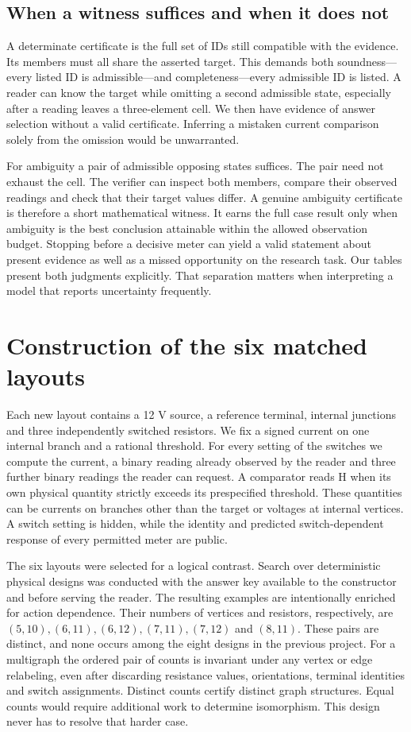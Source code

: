 \documentclass[12pt,letterpaper]{article}
\begin{document}
\subsection{When a witness suffices and when it does not}

A determinate certificate is the full set of IDs still compatible with the evidence. Its members must all share the asserted target. This demands both soundness---every listed ID is admissible---and completeness---every admissible ID is listed. A reader can know the target while omitting a second admissible state, especially after a reading leaves a three-element cell. We then have evidence of answer selection without a valid certificate. Inferring a mistaken current comparison solely from the omission would be unwarranted.

For ambiguity a pair of admissible opposing states suffices. The pair need not exhaust the cell. The verifier can inspect both members, compare their observed readings and check that their target values differ. A genuine ambiguity certificate is therefore a short mathematical witness. It earns the full case result only when ambiguity is the best conclusion attainable within the allowed observation budget. Stopping before a decisive meter can yield a valid statement about present evidence as well as a missed opportunity on the research task. Our tables present both judgments explicitly. That separation matters when interpreting a model that reports uncertainty frequently.


\section{Construction of the six matched layouts}

Each new layout contains a 12 V source, a reference terminal, internal junctions and three independently switched resistors. We fix a signed current on one internal branch and a rational threshold. For every setting of the switches we compute the current, a binary reading already observed by the reader and three further binary readings the reader can request. A comparator reads H when its own physical quantity strictly exceeds its prespecified threshold. These quantities can be currents on branches other than the target or voltages at internal vertices. A switch setting is hidden, while the identity and predicted switch-dependent response of every permitted meter are public.

The six layouts were selected for a logical contrast. Search over deterministic physical designs was conducted with the answer key available to the constructor and before serving the reader. The resulting examples are intentionally enriched for action dependence. Their numbers of vertices and resistors, respectively, are $(5,10),(6,11),(6,12),(7,11),(7,12)$ and $(8,11)$. These pairs are distinct, and none occurs among the eight designs in the previous project. For a multigraph the ordered pair of counts is invariant under any vertex or edge relabeling, even after discarding resistance values, orientations, terminal identities and switch assignments. Distinct counts certify distinct graph structures. Equal counts would require additional work to determine isomorphism. This design never has to resolve that harder case.
\end{document}
